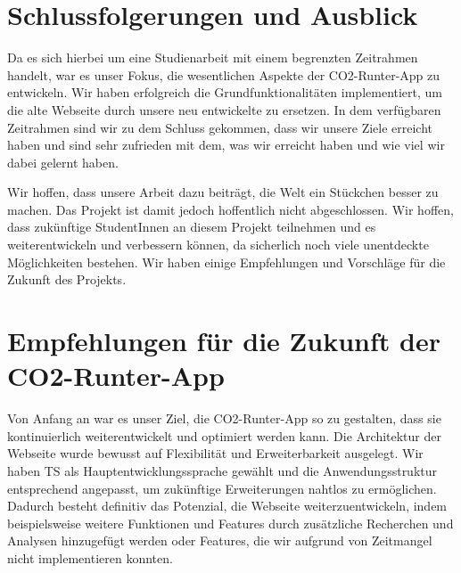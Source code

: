 
\section{Schlussfolgerungen und Ausblick}

Da es sich hierbei um eine Studienarbeit mit einem begrenzten Zeitrahmen handelt, war es unser Fokus, die wesentlichen Aspekte der CO2-Runter-App zu entwickeln. Wir haben erfolgreich die Grundfunktionalitäten implementiert, um die alte Webseite durch unsere neu entwickelte zu ersetzen. In dem verfügbaren Zeitrahmen sind wir zu dem Schluss gekommen, dass wir unsere Ziele erreicht haben und sind sehr zufrieden mit dem, was wir erreicht haben und wie viel wir dabei gelernt haben.

Wir hoffen, dass unsere Arbeit dazu beiträgt, die Welt ein Stückchen besser zu machen. Das Projekt ist damit jedoch hoffentlich nicht abgeschlossen. Wir hoffen, dass zukünftige StudentInnen an diesem Projekt teilnehmen und es weiterentwickeln und verbessern können, da sicherlich noch viele unentdeckte Möglichkeiten bestehen. Wir haben einige Empfehlungen und Vorschläge für die Zukunft des Projekts.

\section{Empfehlungen für die Zukunft der CO2-Runter-App}

Von Anfang an war es unser Ziel, die CO2-Runter-App so zu gestalten, dass sie kontinuierlich weiterentwickelt und optimiert werden kann. Die Architektur der Webseite wurde bewusst auf Flexibilität und Erweiterbarkeit ausgelegt. Wir haben \acl{TS} als Hauptentwicklungssprache gewählt und die Anwendungsstruktur entsprechend angepasst, um zukünftige Erweiterungen nahtlos zu ermöglichen. Dadurch besteht definitiv das Potenzial, die Webseite weiterzuentwickeln, indem beispielsweise weitere Funktionen und Features durch zusätzliche Recherchen und Analysen hinzugefügt werden oder Features, die wir aufgrund von Zeitmangel nicht implementieren konnten.


